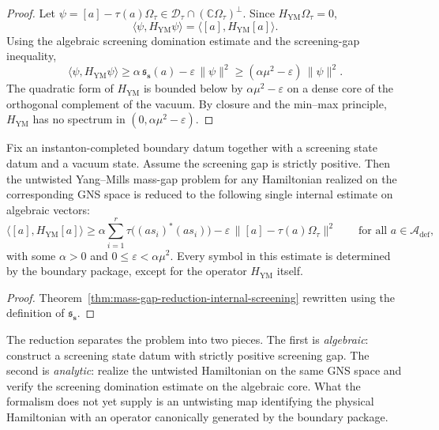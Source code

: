\begin{proof}
Let $\psi=[a]-\tau(a)\Omega_\tau\in \mathcal D_\tau\cap (\mathbb C\Omega_\tau)^{\perp}$.
Since $H_{\mathrm{YM}}\Omega_\tau=0$,
\[
\langle \psi,H_{\mathrm{YM}}\psi\rangle = \langle [a],H_{\mathrm{YM}}[a]\rangle.
\]
Using the algebraic screening domination estimate and the screening-gap inequality,
\[
\langle \psi,H_{\mathrm{YM}}\psi\rangle
\ge
\alpha\,\mathfrak s_{\mathbf s}(a)-\varepsilon\,\|\psi\|^2
\ge
(\alpha\mu^2-\varepsilon)\,\|\psi\|^2.
\]
The quadratic form of $H_{\mathrm{YM}}$ is bounded below by $\alpha\mu^2-\varepsilon$ on a dense core
of the orthogonal complement of the vacuum.
By closure and the min--max principle,
$H_{\mathrm{YM}}$ has no spectrum in $(0,\alpha\mu^2-\varepsilon)$.
\end{proof}

\begin{corollary}
\label{cor:exact-reduction-screening-estimate}
Fix an instanton-completed boundary datum together with a screening state datum and a vacuum state.
Assume the screening gap is strictly positive.
Then the untwisted Yang--Mills mass-gap problem for any Hamiltonian realized on the corresponding GNS space
is reduced to the following single internal estimate on algebraic vectors:
\[
\bigl\langle [a],H_{\mathrm{YM}}[a]\bigr\rangle
\ge
\alpha\sum_{i=1}^r \tau\bigl((a s_i)^*(a s_i)\bigr)
-\varepsilon\,\bigl\|[a]-\tau(a)\Omega_\tau\bigr\|^2
\qquad\text{for all }a\in \mathcal A_{\mathrm{def}},
\]
with some $\alpha>0$ and $0\le \varepsilon<\alpha\mu^2$.
Every symbol in this estimate is determined by the boundary package, except for the operator
$H_{\mathrm{YM}}$ itself.
\end{corollary}

\begin{proof}
Theorem~\ref{thm:mass-gap-reduction-internal-screening} rewritten using the definition of
$\mathfrak s_{\mathbf s}$.
\end{proof}

\begin{remark}
\label{rem:remaining-frontier-after-reduction}
The reduction separates the problem into two pieces.
The first is \emph{algebraic}: construct a screening state datum with strictly positive screening gap.
The second is \emph{analytic}: realize the untwisted Hamiltonian on the same GNS space and verify the
screening domination estimate on the algebraic core.
What the formalism does not yet supply is an untwisting map identifying the physical Hamiltonian with an operator
canonically generated by the boundary package.
\end{remark}

